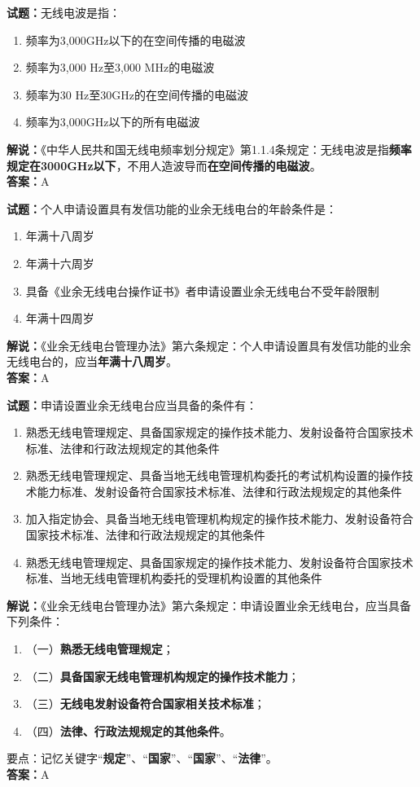 \documentclass{ctexbook}
\begin{document}
\bigskip


\noindent\textbf{试题：}无线电波是指：
\begin{enumerate}[leftmargin=3em]
\item 频率为3,000GHz以下的在空间传播的电磁波
\item 频率为3,000 Hz至3,000 MHz的电磁波
\item 频率为30 Hz至30GHz的在空间传播的电磁波
\item 频率为3,000GHz以下的所有电磁波
\end{enumerate}
\noindent\textbf{解说：}《中华人民共和国无线电频率划分规定》第1.1.4条规定：无线电波是指\textbf{频率规定在3000GHz以下}，不用人造波导而\textbf{在空间传播的电磁波}。\\\noindent\textbf{答案：}A



\bigskip


\noindent\textbf{试题：}个人申请设置具有发信功能的业余无线电台的年龄条件是：
\begin{enumerate}[leftmargin=3em]
\item 年满十八周岁
\item 年满十六周岁
\item 具备《业余无线电台操作证书》者申请设置业余无线电台不受年龄限制
\item 年满十四周岁
\end{enumerate}
\noindent\textbf{解说：}《业余无线电台管理办法》第六条规定：个人申请设置具有发信功能的业余无线电台的，应当\textbf{年满十八周岁}。\\\noindent\textbf{答案：}A



\bigskip


\noindent\textbf{试题：}申请设置业余无线电台应当具备的条件有：
\begin{enumerate}[leftmargin=3em]
\item 熟悉无线电管理规定、具备国家规定的操作技术能力、发射设备符合国家技术标准、法律和行政法规规定的其他条件
\item 熟悉无线电管理规定、具备当地无线电管理机构委托的考试机构设置的操作技术能力标准、发射设备符合国家技术标准、法律和行政法规规定的其他条件
\item 加入指定协会、具备当地无线电管理机构规定的操作技术能力、发射设备符合国家技术标准、法律和行政法规规定的其他条件
\item 熟悉无线电管理规定、具备国家规定的操作技术能力、发射设备符合国家技术标准、当地无线电管理机构委托的受理机构设置的其他条件
\end{enumerate}
\noindent\textbf{解说：}《业余无线电台管理办法》第六条规定：申请设置业余无线电台，应当具备下列条件：
\begin{enumerate}[label=, leftmargin=0.8em]
\item （一）\textbf{熟悉无线电管理规定}；
\item （二）\textbf{具备国家无线电管理机构规定的操作技术能力}；
\item （三）\textbf{无线电发射设备符合国家相关技术标准}；
\item （四）\textbf{法律、行政法规规定的其他条件}。
\end{enumerate}
要点：记忆关键字“\textbf{规定}”、“\textbf{国家}”、“\textbf{国家}”、“\textbf{法律}”。\\\noindent\textbf{答案：}A
\end{document}
